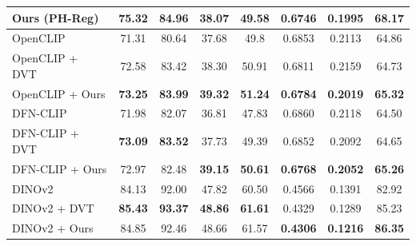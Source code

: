\begin{table}[t!]
{\begin{tabular}{l|cc|cc|ccc}
Ours (PH-Reg)           & \textbf{75.32} & \textbf{84.96} & \textbf{38.07} & \textbf{49.58} & 0.6746 & \textbf{0.1995} & \textbf{68.17} \\ \hline
OpenCLIP~\citep{ilharco_gabriel_2021_5143773}                & 71.31          & 80.64          & 37.68          & 49.8           & 0.6853          & 0.2113          & 64.86          \\
OpenCLIP + DVT~\citep{ilharco_gabriel_2021_5143773,yang2024denoising}             & 72.58          & 83.42          & 38.30          & 50.91          & 0.6811          & 0.2159          & 64.73          \\
OpenCLIP + Ours           & \textbf{73.25} & \textbf{83.99} & \textbf{39.32} & \textbf{51.24} & \textbf{0.6784} & \textbf{0.2019} & \textbf{65.32} \\ \hline
DFN-CLIP~\citep{fang2023data}                & 71.98          & 82.07          & 36.81          & 47.83          & 0.6860          & 0.2118          & 64.50          \\
DFN-CLIP + DVT~\citep{fang2023data, yang2024denoising}            & \textbf{73.09}          & \textbf{83.52}         & 37.73          & 49.39          & 0.6852          & 0.2092          & 64.65          \\
DFN-CLIP + Ours           & 72.97 & 82.48 & \textbf{39.15} & \textbf{50.61} & \textbf{0.6768} & \textbf{0.2052} & \textbf{65.26} \\ \hline
DINOv2~\cite{oquab2023dinov2}                  & 84.13          & 92.00             & 47.82          & 60.50           & 0.4566          & 0.1391          & 82.92          \\
DINOv2 + DVT~\citep{oquab2023dinov2,yang2024denoising}              & \textbf{85.43}         & \textbf{93.37}          & \textbf{48.86}          & \textbf{61.61}          & 0.4329          & 0.1289          & 85.23          \\
DINOv2 + Ours            & 84.85 & 92.46 & 48.66 & 61.57 & \textbf{0.4306} & \textbf{0.1216} & \textbf{86.35} \\ \hline
\end{tabular}%
}
\vspace{-.2cm}
\label{tab:linear}
\end{table}